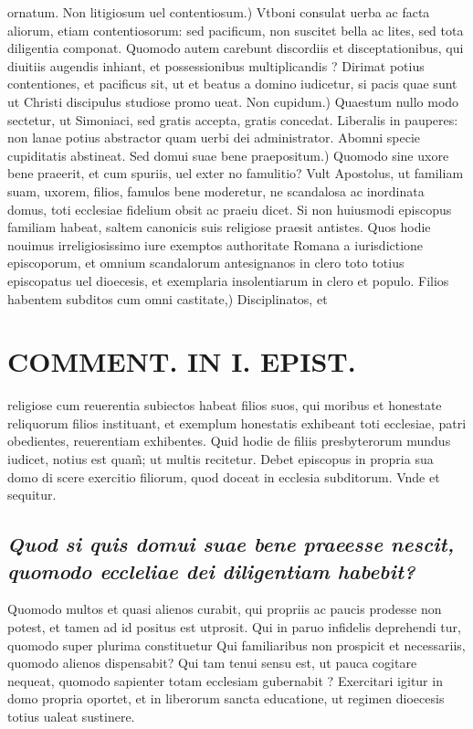 \documentclass{article}
\begin{document}
\begin{pages}
ornatum. Non litigiosum uel contentiosum.) Vtboni consulat uerba ac facta aliorum, etiam contentiosorum: sed pacificum, non suscitet bella ac lites, sed tota diligentia componat. Quomodo autem carebunt discordiis et disceptationibus, qui diuitiis augendis inhiant, et possessionibus multiplicandis ? Dirimat potius contentiones, et pacificus sit, ut et beatus a domino iudicetur, si pacis quae sunt ut Christi discipulus studiose promo ueat. Non cupidum.) Quaestum nullo modo sectetur, ut Simoniaci, sed gratis accepta, gratis concedat. Liberalis in pauperes: non lanae potius abstractor quam uerbi dei administrator. Abomni specie cupiditatis abstineat. Sed domui suae bene praepositum.) Quomodo sine uxore bene praeerit, et cum spuriis, uel exter no famulitio? Vult Apostolus, ut familiam suam, uxorem, filios, famulos bene moderetur, ne scandalosa ac inordinata domus, toti ecclesiae fidelium obsit ac praeiu dicet. Si non huiusmodi episcopus familiam habeat, saltem canonicis suis religiose praesit antistes. Quos hodie nouimus irreligiosissimo iure exemptos authoritate Romana a iurisdictione episcoporum, et omnium scandalorum antesignanos in clero toto totius episcopatus uel dioecesis, et exemplaria insolentiarum in clero et populo. Filios habentem subditos cum omni castitate,) Disciplinatos, et  \pend
\section*{COMMENT. IN I. EPIST. }
\marginpar{[ p.498 ]}\pstart religiose cum reuerentia subiectos habeat filios suos, qui moribus et honestate reliquorum filios instituant, et exemplum honestatis exhibeant toti ecclesiae, patri obedientes, reuerentiam exhibentes. Quid hodie de filiis presbyterorum mundus iudicet, notius est quam̃; ut multis recitetur. Debet episcopus in propria sua domo di scere exercitio filiorum, quod doceat in ecclesia subditorum. Vnde et sequitur.  \pend
{}
{}
\subsection*{\textit{Quod si quis domui suae bene praeesse nescit, quomodo eccleliae dei diligentiam habebit? }}\pstart Quomodo multos et quasi alienos curabit, qui propriis ac paucis prodesse non potest, et tamen ad id positus est utprosit. Qui in paruo infidelis deprehendi tur, quomodo super plurima constituetur Qui familiaribus non prospicit et necessariis, quomodo alienos dispensabit? Qui tam tenui sensu est, ut pauca cogitare nequeat, quomodo sapienter totam ecclesiam gubernabit ? Exercitari igitur in domo propria oportet, et in liberorum sancta educatione, ut regimen dioecesis totius ualeat sustinere.  \pend
{}
{}

\end{pages}
\end{document}
